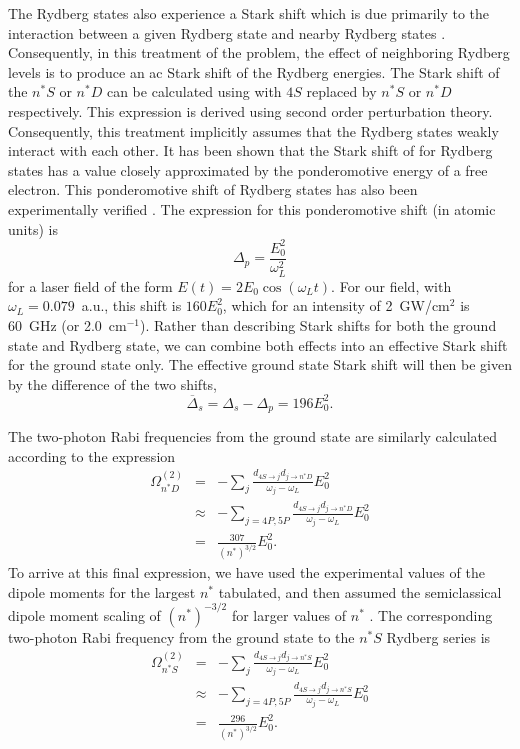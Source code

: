 The Rydberg states also experience a Stark shift which is due primarily to the
interaction between a given Rydberg state and nearby Rydberg states
\cite{Fedorov:89b}.  Consequently, in this treatment of the problem, the effect
of neighboring Rydberg levels is to produce an ac Stark shift of the Rydberg
energies.  The Stark shift of the $n^*S$ or $n^*D$ can be calculated
using  with $4S$ replaced by $n^*S$ or $n^*D$ respectively. 
This expression is derived using second order perturbation theory. 
Consequently, this treatment implicitly assumes that the Rydberg states weakly
interact with each other.  It has been shown \cite{Avan:76} that the Stark
shift of  for Rydberg states has a value closely approximated by
the ponderomotive energy of a free electron.  This ponderomotive shift of
Rydberg states has also been experimentally verified
\cite{Liberman:83,Obrian:94}. The expression for this ponderomotive shift (in
atomic units) is 
\begin{equation}
\Delta_p = \frac{E_0^2}{\omega_L^2}
\end{equation}
for a laser field of the form $E(t) = 2 E_0 \cos(\omega_L t)$.  For our field,
with $\omega_L =0.079$~a.u., this shift is $160E_0^2$, which for an
intensity of 2~GW/cm$^2$ is 60~GHz (or 2.0~cm$^{-1}$).
Rather than describing Stark shifts for both the ground state and Rydberg
state, we can combine both effects into an effective Stark shift for
the ground state only.  The effective ground state Stark shift will then be
given by the difference of the two shifts,
\begin{equation}
\overline{\Delta}_s = \Delta_s -\Delta_p = 196 E_0^2.
\end{equation}

The two-photon Rabi frequencies from the ground state are similarly calculated
according to the expression
\begin{eqnarray}
\Omega_{n^*D}^{(2)}& =
&-\sum_{j}\frac{d_{4S \rightarrow j}d_{j \rightarrow n^*D}}{\omega_j -
\omega_L}E_0^2 \\
& \approx & -\sum_{j=4P,5P}\frac{d_{4S \rightarrow j}d_{j
\rightarrow n^*D}}{\omega_j -
\omega_L}E_0^2 \\
& = & \frac{307}{(n^*)^{3/2}}E_0^2.
\end{eqnarray}
To arrive at this final expression, we have used the experimental values of the
dipole moments for the largest $n^*$ tabulated, and then assumed the
semiclassical dipole moment scaling of $(n^*)^{-3/2}$ for larger values
of $n^*$ \cite{Gallagher_book}.  The corresponding two-photon Rabi frequency
from the ground state to the $n^*S$ Rydberg series is
\begin{eqnarray}
\Omega_{n^*S}^{(2)}& =
&-\sum_{j}\frac{d_{4S \rightarrow j}d_{j \rightarrow n^*S}}{\omega_j -
\omega_L}E_0^2 \\
& \approx & -\sum_{j=4P,5P}\frac{d_{4S \rightarrow j}d_{j
\rightarrow n^*S}}{\omega_j -
\omega_L}E_0^2 \\
& = & \frac{296}{(n^*)^{3/2}}E_0^2.
\end{eqnarray}

